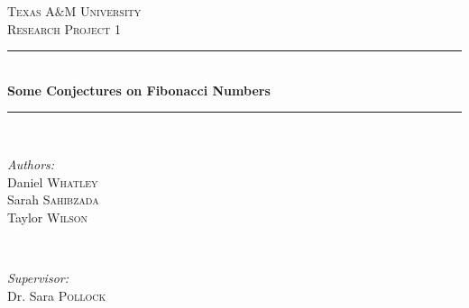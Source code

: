 \documentclass[11pt]{article}
\begin{document}
\tracingall








\begin{titlepage}

\newcommand{\HRule}{\rule{\linewidth}{0.5mm}} 

\center %
 

\textsc{\LARGE Texas A$\&$M University}\\[1.5cm] 
\textsc{\Large Research Project 1}\\[0.5cm] %


\HRule \\[0.4cm]
{ \huge \bfseries Some Conjectures on Fibonacci Numbers }\\[0.4cm]  %
\HRule \\[1.5cm]
 

\begin{minipage}{0.4\textwidth}
\begin{flushleft} \large
\emph{Authors:}\\
Daniel \textsc{Whatley}\\
Sarah \textsc{Sahibzada}\\
Taylor \textsc{Wilson}
\end{flushleft}
\end{minipage}
~
\begin{minipage}{0.4\textwidth}
\begin{flushright} \large
\emph{Supervisor:} \\
Dr. Sara \textsc{Pollock} 
\end{flushright}
\end{minipage}\\[4cm]


\end{titlepage}
\end{document}
